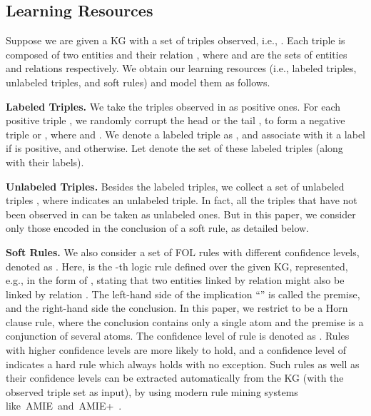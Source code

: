 \documentclass[letterpaper]{article} \usepackage{aaai18}  \usepackage{times}  \usepackage{helvet}  \usepackage{courier}  \usepackage{url}  \usepackage{graphicx}  \usepackage{amsmath}
\begin{document}
\subsection{Learning Resources}
Suppose we are given a KG with a set of triples observed, i.e., . Each triple is composed of two entities  and their relation , where  and  are the sets of entities and relations respectively. We obtain our learning resources (i.e., labeled triples, unlabeled triples, and soft rules) and model them as follows.

\smallskip
\noindent\textbf{Labeled Triples.} We take the triples observed in  as positive ones. For each positive triple , we randomly corrupt the head  or the tail , to form a negative triple  or , where  and . We denote a labeled triple as , and associate with it a label  if  is positive, and  otherwise. Let  denote the set of these labeled triples (along with their labels).

\smallskip
\noindent\textbf{Unlabeled Triples.} Besides the labeled triples, we collect a set of unlabeled triples , where  indicates an unlabeled triple. In fact, all the triples that have not been observed in  can be taken as unlabeled ones. But in this paper, we consider only those encoded in the conclusion of a soft rule, as detailed below.

\smallskip
\noindent\textbf{Soft Rules.} We also consider a set of FOL rules with different confidence levels, denoted as . Here,  is the -th logic rule defined over the given KG, represented, e.g., in the form of , stating that two entities linked by relation  might also be linked by relation . The left-hand side of the implication ``'' is called the premise, and the right-hand side the conclusion. In this paper, we restrict  to be a Horn clause rule, where the conclusion contains only a single atom and the premise is a conjunction of several atoms. The confidence level of rule  is denoted as . Rules with higher confidence levels are more likely to hold, and a confidence level of  indicates a hard rule which always holds with no exception. Such rules as well as their confidence levels can be extracted automatically from the KG (with the observed triple set  as input), by using modern rule mining systems \mbox{like AMIE and AMIE+~\cite{galarraga2013:AMIE,galarraga2015:AMIE+}.}
\end{document}
